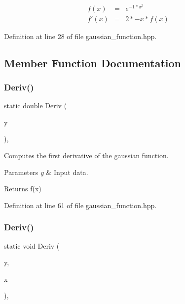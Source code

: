 \begin{eqnarray*} f(x) &=& e^{-1 * x^2} \\ f'(x) &=& 2 * -x * f(x) \end{eqnarray*} 

Definition at line 28 of file gaussian\+\_\+function.\+hpp.



\subsection{Member Function Documentation}
\mbox{\label{classmlpack_1_1ann_1_1GaussianFunction_a163d34fd09f8edf457164f5033c635cf}} 
\subsubsection{Deriv()\hspace{0.1cm}{\footnotesize\ttfamily [1/2]}}
{\footnotesize\ttfamily static double Deriv (\begin{DoxyParamCaption}\item[{const double}]{y }\end{DoxyParamCaption})\hspace{0.3cm}{\ttfamily [inline]}, {\ttfamily [static]}}



Computes the first derivative of the gaussian function. 


\begin{DoxyParams}{Parameters}
{\em y} & Input data. \\
\hline
\end{DoxyParams}
\begin{DoxyReturn}{Returns}
f\textquotesingle{}(x) 
\end{DoxyReturn}


Definition at line 61 of file gaussian\+\_\+function.\+hpp.

\mbox{\label{classmlpack_1_1ann_1_1GaussianFunction_ad442502c34b67303b74c735641dab790}} 
\subsubsection{Deriv()\hspace{0.1cm}{\footnotesize\ttfamily [2/2]}}
{\footnotesize\ttfamily static void Deriv (\begin{DoxyParamCaption}\item[{const Input\+Vec\+Type \&}]{y,  }\item[{Output\+Vec\+Type \&}]{x }\end{DoxyParamCaption})\hspace{0.3cm}{\ttfamily [inline]}, {\ttfamily [static]}}



